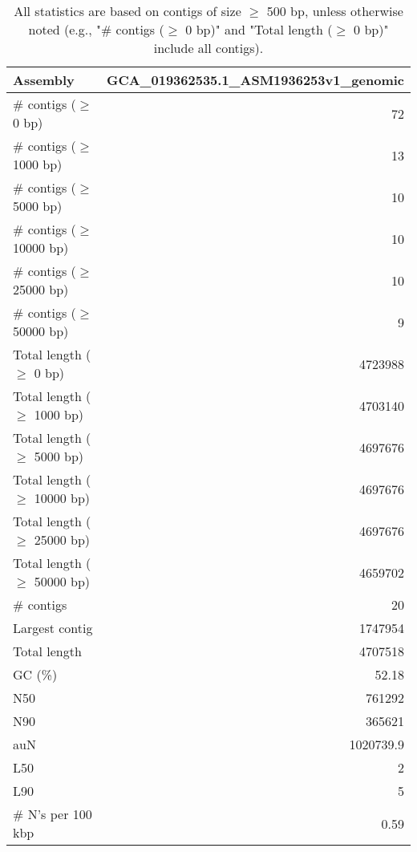 \documentclass[12pt,a4paper]{article}
\begin{document}
\begin{table}[ht]
\begin{center}
\caption{All statistics are based on contigs of size $\geq$ 500 bp, unless otherwise noted (e.g., "\# contigs ($\geq$ 0 bp)" and "Total length ($\geq$ 0 bp)" include all contigs).}
\begin{tabular}{|l*{1}{|r}|}
\hline
Assembly & GCA\_019362535.1\_ASM1936253v1\_genomic \\ \hline
\# contigs ($\geq$ 0 bp) & 72 \\ \hline
\# contigs ($\geq$ 1000 bp) & 13 \\ \hline
\# contigs ($\geq$ 5000 bp) & 10 \\ \hline
\# contigs ($\geq$ 10000 bp) & 10 \\ \hline
\# contigs ($\geq$ 25000 bp) & 10 \\ \hline
\# contigs ($\geq$ 50000 bp) & 9 \\ \hline
Total length ($\geq$ 0 bp) & 4723988 \\ \hline
Total length ($\geq$ 1000 bp) & 4703140 \\ \hline
Total length ($\geq$ 5000 bp) & 4697676 \\ \hline
Total length ($\geq$ 10000 bp) & 4697676 \\ \hline
Total length ($\geq$ 25000 bp) & 4697676 \\ \hline
Total length ($\geq$ 50000 bp) & 4659702 \\ \hline
\# contigs & 20 \\ \hline
Largest contig & 1747954 \\ \hline
Total length & 4707518 \\ \hline
GC (\%) & 52.18 \\ \hline
N50 & 761292 \\ \hline
N90 & 365621 \\ \hline
auN & 1020739.9 \\ \hline
L50 & 2 \\ \hline
L90 & 5 \\ \hline
\# N's per 100 kbp & 0.59 \\ \hline
\end{tabular}
\end{center}
\end{table}
\end{document}
